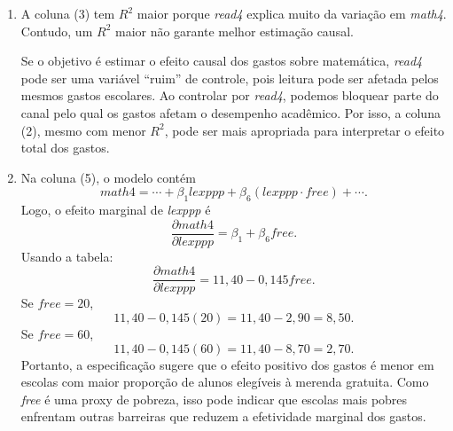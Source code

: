 \documentclass[12pt,letterpaper,onecolumn]{exam}
\begin{document}
\begin{questions}
\begin{enumerate}[label=(\alph*)]
    \item A coluna (3) tem \(R^2\) maior porque \textit{read4} explica muito da variação em \textit{math4}. Contudo, um \(R^2\) maior não garante melhor estimação causal.

    Se o objetivo é estimar o efeito causal dos gastos sobre matemática, \textit{read4} pode ser uma variável ``ruim'' de controle, pois leitura pode ser afetada pelos mesmos gastos escolares. Ao controlar por \textit{read4}, podemos bloquear parte do canal pelo qual os gastos afetam o desempenho acadêmico. Por isso, a coluna (2), mesmo com menor \(R^2\), pode ser mais apropriada para interpretar o efeito total dos gastos.

    \item Na coluna (5), o modelo contém
    \[
    math4=\cdots+\beta_1lexppp+\beta_6(lexppp\cdot free)+\cdots.
    \]
    Logo, o efeito marginal de \textit{lexppp} é
    \[
    \frac{\partial math4}{\partial lexppp}
    =
    \beta_1+\beta_6free.
    \]
    Usando a tabela:
    \[
    \frac{\partial math4}{\partial lexppp}
    =
    11{,}40-0{,}145free.
    \]
    Se \(\textit{free}=20\),
    \[
    11{,}40-0{,}145(20)
    =
    11{,}40-2{,}90
    =
    8{,}50.
    \]
    Se \(\textit{free}=60\),
    \[
    11{,}40-0{,}145(60)
    =
    11{,}40-8{,}70
    =
    2{,}70.
    \]
    Portanto, a especificação sugere que o efeito positivo dos gastos é menor em escolas com maior proporção de alunos elegíveis à merenda gratuita. Como \textit{free} é uma proxy de pobreza, isso pode indicar que escolas mais pobres enfrentam outras barreiras que reduzem a efetividade marginal dos gastos.
\end{enumerate}

\end{questions}
\end{document}
